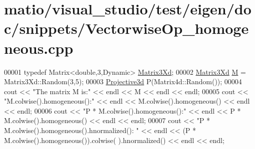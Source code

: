 \hypertarget{matio_2visual__studio_2test_2eigen_2doc_2snippets_2_vectorwise_op__homogeneous_8cpp_source}{}\section{matio/visual\+\_\+studio/test/eigen/doc/snippets/\+Vectorwise\+Op\+\_\+homogeneous.cpp}
\label{matio_2visual__studio_2test_2eigen_2doc_2snippets_2_vectorwise_op__homogeneous_8cpp_source}

\begin{DoxyCode}
00001 \textcolor{keyword}{typedef} Matrix<double,3,Dynamic> \hyperlink{group___core___module_class_eigen_1_1_matrix}{Matrix3Xd};
00002 \hyperlink{group___core___module_class_eigen_1_1_matrix}{Matrix3Xd} \hyperlink{group___core___module_class_eigen_1_1_matrix}{M} = Matrix3Xd::Random(3,5);
00003 \hyperlink{group___geometry___module_gab9cec8c457da930391eb73370e07aaae}{Projective3d} P(Matrix4d::Random());
00004 cout << \textcolor{stringliteral}{"The matrix M is:"} << endl << M << endl << endl;
00005 cout << \textcolor{stringliteral}{"M.colwise().homogeneous():"} << endl << M.colwise().homogeneous() << endl << endl;
00006 cout << \textcolor{stringliteral}{"P * M.colwise().homogeneous():"} << endl << P * M.colwise().homogeneous() << endl << endl;
00007 cout << \textcolor{stringliteral}{"P * M.colwise().homogeneous().hnormalized(): "} << endl << (P * M.colwise().homogeneous()).colwise(
      ).hnormalized() << endl << endl;
\end{DoxyCode}

